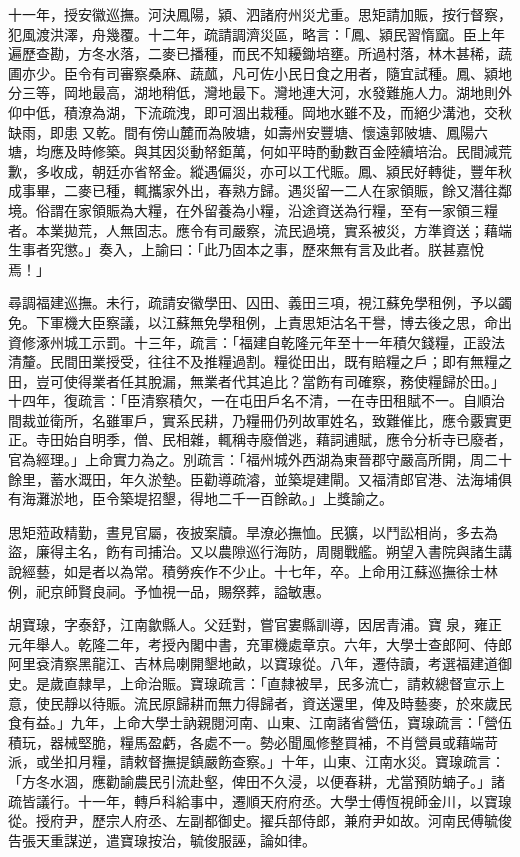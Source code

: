 \begin{pinyinscope}
十一年，授安徽巡撫。河決鳳陽，潁、泗諸府州災尤重。思矩請加賑，按行督察，犯風渡洪澤，舟幾覆。十二年，疏請調濟災區，略言：「鳳、潁民習惰窳。臣上年遍歷查勘，方冬水落，二麥已播種，而民不知耰鋤培壅。所過村落，林木甚稀，蔬圃亦少。臣令有司審察桑麻、蔬蓏，凡可佐小民日食之用者，隨宜試種。鳳、潁地分三等，岡地最高，湖地稍低，灣地最下。灣地連大河，水發難施人力。湖地則外仰中低，積潦為湖，下流疏洩，即可涸出栽種。岡地水雖不及，而絕少溝池，交秋缺雨，即患又乾。間有傍山麓而為陂塘，如壽州安豐塘、懷遠郭陂塘、鳳陽六塘，均應及時修築。與其因災動帑鉅萬，何如平時酌動數百金陸續培治。民間減荒歉，多收成，朝廷亦省帑金。縱遇偏災，亦可以工代賑。鳳、潁民好轉徙，豐年秋成事畢，二麥已種，輒攜家外出，春熟方歸。遇災留一二人在家領賑，餘又潛往鄰境。俗謂在家領賑為大糧，在外留養為小糧，沿途資送為行糧，至有一家領三糧者。本業拋荒，人無固志。應令有司嚴察，流民過境，實系被災，方準資送；藉端生事者究懲。」奏入，上諭曰：「此乃固本之事，歷來無有言及此者。朕甚嘉悅焉！」

尋調福建巡撫。未行，疏請安徽學田、囚田、義田三項，視江蘇免學租例，予以蠲免。下軍機大臣察議，以江蘇無免學租例，上責思矩沽名干譽，博去後之思，命出資修涿州城工示罰。十三年，疏言：「福建自乾隆元年至十一年積欠錢糧，正設法清釐。民間田業授受，往往不及推糧過割。糧從田出，既有賠糧之戶；即有無糧之田，豈可使得業者任其脫漏，無業者代其追比？當飭有司確察，務使糧歸於田。」十四年，復疏言：「臣清察積欠，一在屯田戶名不清，一在寺田租賦不一。自順治間裁並衛所，名雖軍戶，實系民耕，乃糧冊仍列故軍姓名，致難催比，應令覈實更正。寺田始自明季，僧、民相雜，輒稱寺廢僧逃，藉詞逋賦，應令分析寺已廢者，官為經理。」上命實力為之。別疏言：「福州城外西湖為東晉郡守嚴高所開，周二十餘里，蓄水溉田，年久淤墊。臣勸導疏濬，並築堤建閘。又福清郎官港、法海埔俱有海灘淤地，臣令築堤招墾，得地二千一百餘畝。」上獎諭之。

思矩蒞政精勤，晝見官屬，夜披案牘。旱潦必撫恤。民獷，以鬥訟相尚，多去為盜，廉得主名，飭有司捕治。又以農隙巡行海防，周閱戰艦。朔望入書院與諸生講說經藝，如是者以為常。積勞疾作不少止。十七年，卒。上命用江蘇巡撫徐士林例，祀京師賢良祠。予恤視一品，賜祭葬，謚敏惠。

胡寶瑔，字泰舒，江南歙縣人。父廷對，嘗官婁縣訓導，因居青浦。寶泉，雍正元年舉人。乾隆二年，考授內閣中書，充軍機處章京。六年，大學士查郎阿、侍郎阿里袞清察黑龍江、吉林烏喇開墾地畝，以寶瑔從。八年，遷侍讀，考選福建道御史。是歲直隸旱，上命治賑。寶瑔疏言：「直隸被旱，民多流亡，請敕總督宣示上意，使民靜以待賑。流民原歸耕而無力得歸者，資送還里，俾及時藝麥，於來歲民食有益。」九年，上命大學士訥親閱河南、山東、江南諸省營伍，寶瑔疏言：「營伍積玩，器械堅脆，糧馬盈虧，各處不一。勢必聞風修整買補，不肖營員或藉端苛派，或坐扣月糧，請敕督撫提鎮嚴飭查察。」十年，山東、江南水災。寶瑔疏言：「方冬水涸，應勸諭農民引流赴壑，俾田不久浸，以便春耕，尤當預防蝻子。」諸疏皆議行。十一年，轉戶科給事中，遷順天府府丞。大學士傅恆視師金川，以寶瑔從。授府尹，歷宗人府丞、左副都御史。擢兵部侍郎，兼府尹如故。河南民傅毓俊告張天重謀逆，遣寶瑔按治，毓俊服誣，論如律。


\end{pinyinscope}
